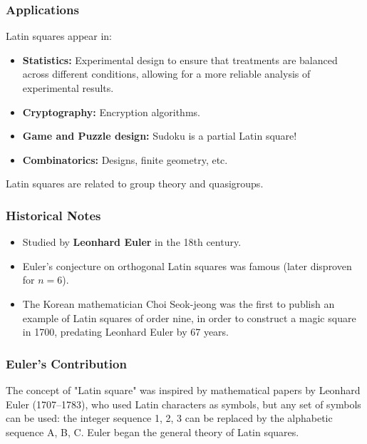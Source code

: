 \documentclass{beamer}
\begin{document}
\begin{frame}
\frametitle{Applications}
Latin squares appear in:
\begin{itemize}
  \item \textbf{Statistics:} Experimental design to ensure that treatments are balanced across different conditions, allowing for a more reliable analysis of experimental results.
  \item \textbf{Cryptography:} Encryption algorithms.
  \item \textbf{Game and Puzzle design:} Sudoku is a partial Latin square!
  \item \textbf{Combinatorics:} Designs, finite geometry, etc.
\end{itemize}

Latin squares are related to group theory and quasigroups.

\end{frame}

\begin{frame}
\frametitle{Historical Notes}
\begin{itemize}
  \item Studied by \textbf{Leonhard Euler} in the 18th century.
  \item Euler's conjecture on orthogonal Latin squares was famous (later disproven for $n=6$).
  \item The Korean mathematician Choi Seok-jeong was the first to publish an example of Latin squares of order nine, in order to construct a magic square in 1700, predating Leonhard Euler by 67 years.
\end{itemize}
\end{frame}

\begin{frame}
\frametitle{Euler's Contribution}
The concept of "Latin square" was inspired by mathematical papers by Leonhard Euler (1707–1783), who used Latin characters as symbols, but any set of symbols can be used: the integer sequence 1, 2, 3 can be replaced by the alphabetic sequence A, B, C.
Euler began the general theory of Latin squares.
\end{frame}
\end{document}
